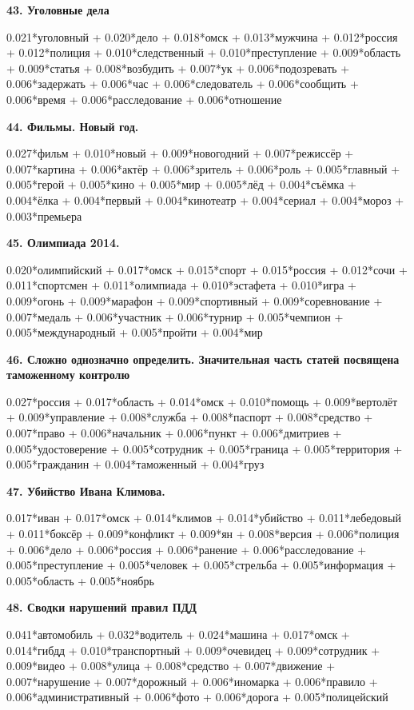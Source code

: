 \textbf{43. Уголовные дела}

0.021*уголовный + 0.020*дело + 0.018*омск + 0.013*мужчина + 0.012*россия + 0.012*полиция + 0.010*следственный + 0.010*преступление + 0.009*область + 0.009*статья + 0.008*возбудить + 0.007*ук + 0.006*подозревать + 0.006*задержать + 0.006*час + 0.006*следователь + 0.006*сообщить + 0.006*время + 0.006*расследование + 0.006*отношение

\textbf{44. Фильмы. Новый год.}

0.027*фильм + 0.010*новый + 0.009*новогодний + 0.007*режиссёр + 0.007*картина + 0.006*актёр + 0.006*зритель + 0.006*роль + 0.005*главный + 0.005*герой + 0.005*кино + 0.005*мир + 0.005*лёд + 0.004*съёмка + 0.004*ёлка + 0.004*первый + 0.004*кинотеатр + 0.004*сериал + 0.004*мороз + 0.003*премьера

\textbf{45. Олимпиада 2014.}

0.020*олимпийский + 0.017*омск + 0.015*спорт + 0.015*россия + 0.012*сочи + 0.011*спортсмен + 0.011*олимпиада + 0.010*эстафета + 0.010*игра + 0.009*огонь + 0.009*марафон + 0.009*спортивный + 0.009*соревнование + 0.007*медаль + 0.006*участник + 0.006*турнир + 0.005*чемпион + 0.005*международный + 0.005*пройти + 0.004*мир

\textbf{46. Сложно однозначно определить. Значительная часть статей посвящена таможенному контролю}

0.027*россия + 0.017*область + 0.014*омск + 0.010*помощь + 0.009*вертолёт + 0.009*управление + 0.008*служба + 0.008*паспорт + 0.008*средство + 0.007*право + 0.006*начальник + 0.006*пункт + 0.006*дмитриев + 0.005*удостоверение + 0.005*сотрудник + 0.005*граница + 0.005*территория + 0.005*гражданин + 0.004*таможенный + 0.004*груз

\textbf{47. Убийство Ивана Климова\footnotemark.}

0.017*иван + 0.017*омск + 0.014*климов + 0.014*убийство + 0.011*лебедовый + 0.011*боксёр + 0.009*конфликт + 0.009*ян + 0.008*версия + 0.006*полиция + 0.006*дело + 0.006*россия + 0.006*ранение + 0.006*расследование + 0.005*преступление + 0.005*человек + 0.005*стрельба + 0.005*информация + 0.005*область + 0.005*ноябрь

\textbf{48. Сводки нарушений правил ПДД}

0.041*автомобиль + 0.032*водитель + 0.024*машина + 0.017*омск + 0.014*гибдд + 0.010*транспортный + 0.009*очевидец + 0.009*сотрудник + 0.009*видео + 0.008*улица + 0.008*средство + 0.007*движение + 0.007*нарушение + 0.007*дорожный + 0.006*иномарка + 0.006*правило + 0.006*административный + 0.006*фото + 0.006*дорога + 0.005*полицейский

